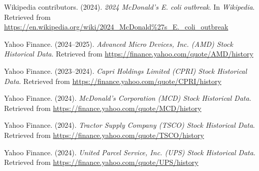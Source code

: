 \documentclass[12pt,a4paper]{article}
\begin{document}
\begin{thebibliography}{9}
 Wikipedia contributors. (2024).  
\textit{2024 McDonald’s E. coli outbreak}. In \textit{Wikipedia}.  
Retrieved from \url{https://en.wikipedia.org/wiki/2024_McDonald%27s_E._coli_outbreak}

 Yahoo Finance. (2024–2025).  
\textit{Advanced Micro Devices, Inc. (AMD) Stock Historical Data}.  
Retrieved from \url{https://finance.yahoo.com/quote/AMD/history}

 Yahoo Finance. (2023–2024).  
\textit{Capri Holdings Limited (CPRI) Stock Historical Data}.  
Retrieved from \url{https://finance.yahoo.com/quote/CPRI/history}

 Yahoo Finance. (2024).  
\textit{McDonald’s Corporation (MCD) Stock Historical Data}.  
Retrieved from \url{https://finance.yahoo.com/quote/MCD/history}

 Yahoo Finance. (2024).  
\textit{Tractor Supply Company (TSCO) Stock Historical Data}.  
Retrieved from \url{https://finance.yahoo.com/quote/TSCO/history}

 Yahoo Finance. (2024).  
\textit{United Parcel Service, Inc. (UPS) Stock Historical Data}.  
Retrieved from \url{https://finance.yahoo.com/quote/UPS/history}

\end{thebibliography}
\end{document}
